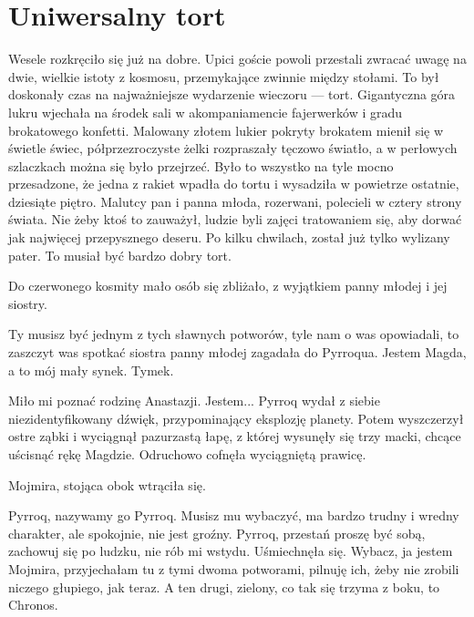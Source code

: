 \chapter{Uniwersalny tort}


Wesele rozkręciło się już na dobre. 
Upici goście powoli przestali zwracać uwagę na dwie, wielkie istoty z kosmosu, przemykające zwinnie między stołami.
To był doskonały czas na najważniejsze wydarzenie wieczoru --- tort.
Gigantyczna góra lukru wjechała na środek sali w akompaniamencie fajerwerków i gradu brokatowego konfetti. 
Malowany złotem lukier pokryty brokatem mienił się w świetle świec, półprzezroczyste żelki rozpraszały tęczowo światło, a w perłowych szlaczkach można się było przejrzeć.
Było to wszystko na tyle mocno przesadzone, że jedna z rakiet wpadła do tortu i wysadziła w powietrze ostatnie, dziesiąte piętro.
Malutcy pan i panna młoda, rozerwani, polecieli w cztery strony świata.
Nie żeby ktoś to zauważył, ludzie byli zajęci tratowaniem się, aby dorwać jak najwięcej przepysznego deseru. 
Po kilku chwilach, został już tylko wylizany pater. To musiał być bardzo dobry tort.

Do czerwonego kosmity mało osób się zbliżało, z wyjątkiem panny młodej i jej siostry.

\ds{} Ty musisz być jednym z tych sławnych potworów, tyle nam o was opowiadali, to zaszczyt was spotkać \dm{} siostra panny młodej zagadała do Pyrroqua. \dm{}
Jestem Magda, a to mój mały synek. Tymek. \de{}

\ds{} Miło mi poznać rodzinę Anastazji. Jestem... \dm{} Pyrroq wydał z siebie niezidentyfikowany dźwięk, przypominający eksplozję planety.
Potem wyszczerzył ostre ząbki i wyciągnął pazurzastą łapę, z której wysunęły się trzy macki, chcące uścisnąć rękę Magdzie. Odruchowo cofnęła wyciągniętą prawicę. \de{}

Mojmira, stojąca obok wtrąciła się.

\ds{} Pyrroq, nazywamy go Pyrroq. Musisz mu wybaczyć, ma bardzo trudny i wredny charakter, ale spokojnie, nie jest groźny. 
Pyrroq, przestań proszę być sobą, zachowuj się po ludzku, nie rób mi wstydu.
\dm{} Uśmiechnęła się. \dm{}
Wybacz, ja jestem Mojmira, przyjechałam tu z tymi dwoma potworami, pilnuję ich, żeby nie zrobili niczego głupiego, jak teraz. 
A ten drugi, zielony, co tak się trzyma z boku, to Chronos. \de{}

